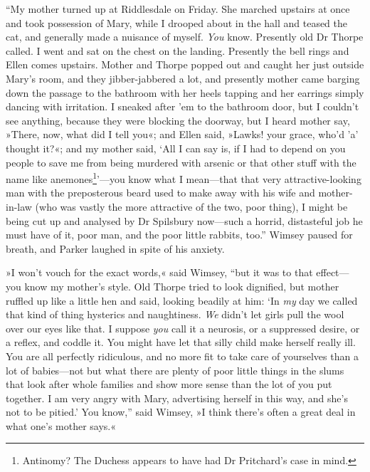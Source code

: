 \enquote{My mother turned up at Riddlesdale on Friday. She marched upstairs at once and took possession of Mary, while I drooped about in the hall and teased the cat, and generally made a nuisance of myself. \textit{You} know. Presently old Dr Thorpe called. I went and sat on the chest on the landing. Presently the bell rings and Ellen comes upstairs. Mother and Thorpe popped out and caught her just outside Mary's room, and they jibber-jabbered a lot, and presently mother came barging down the passage to the bathroom with her heels tapping and her earrings simply dancing with irritation. I sneaked after 'em to the bathroom door, but I couldn't see anything, because they were blocking the doorway, but I heard mother say, »There, now, what did I tell you«; and Ellen said, »Lawks! your grace, who'd 'a' thought it?«; and my mother said, \enquote{All I can say is, if I had to depend on you people to save me from being murdered with arsenic or that other stuff with the name like anemones\footnote{Antinomy? The Duchess appears to have had Dr Pritchard's case in mind.}}---you know what I mean\allowbreak---\allowbreak that that very attractive-looking man with the preposterous beard used to make away with his wife and mother-in-law (who was vastly the more attractive of the two, poor thing), I might be being cut up and analysed by Dr Spilsbury now\allowbreak---\allowbreak such a horrid, distasteful job he must have of it, poor man, and the poor little rabbits, too.} Wimsey paused for breath, and Parker laughed in spite of his anxiety.

»I won't vouch for the exact words,« said Wimsey, \enquote{but it was to that effect\allowbreak---\allowbreak you know my mother's style. Old Thorpe tried to look dignified, but mother ruffled up like a little hen and said, looking beadily at him: \enquote{In \textit{my} day we called that kind of thing hysterics and naughtiness. \textit{We} didn't let girls pull the wool over our eyes like that. I suppose \textit{you} call it a neurosis, or a suppressed desire, or a reflex, and coddle it. You might have let that silly child make herself really ill. You are all perfectly ridiculous, and no more fit to take care of yourselves than a lot of babies\allowbreak---\allowbreak not but what there are plenty of poor little things in the slums that look after whole families and show more sense than the lot of you put together. I am very angry with Mary, advertising herself in this way, and she's not to be pitied.} You know,} said Wimsey, »I think there's often a great deal in what one's mother says.«

